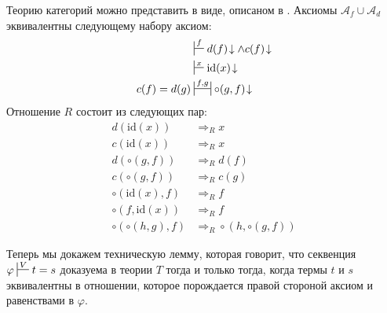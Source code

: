 \documentclass[reqno]{amsart}
\theoremstyle{definition}
\theoremstyle{remark}
\newcommand{\fs}[1]{\mathrm{#1}}
\begin{document}
\begin{example}
Теорию категорий можно представить в виде, описаном в .
Аксиомы $\mathcal{A}_f \cup \mathcal{A}_d$ эквивалентны следующему набору аксиом:
\begin{align*}
& \sststile{}{f} d(f)\!\downarrow \land c(f)\!\downarrow \\
& \sststile{}{x} \fs{id}(x)\!\downarrow \\
c(f) = d(g) & \ssststile{}{f,g} \circ(g,f)\!\downarrow
\end{align*}
Отношение $R$ состоит из следующих пар:
\begin{align*}
d(\fs{id}(x)) & \Rightarrow_R x \\
c(\fs{id}(x)) & \Rightarrow_R x \\
d(\circ(g,f)) & \Rightarrow_R d(f) \\
c(\circ(g,f)) & \Rightarrow_R c(g) \\
\circ(\fs{id}(x),f) & \Rightarrow_R f \\
\circ(f,\fs{id}(x)) & \Rightarrow_R f \\
\circ(\circ(h,g),f) & \Rightarrow_R \circ(h,\circ(g,f))
\end{align*}
\end{example}

Теперь мы докажем техническую лемму, которая говорит, что секвенция $\varphi \sststile{}{V} t = s$ доказуема в теории $T$ тогда и только тогда,
когда термы $t$ и $s$ эквивалентны в отношении, которое порождается правой стороной аксиом и равенствами в $\varphi$.
\end{document}
